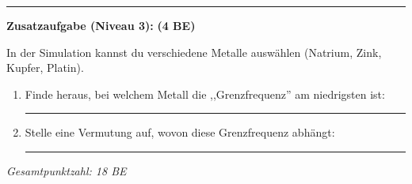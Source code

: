 \documentclass[11pt,a4paper]{article}
\begin{document}
\vspace{1em}


\hrule
\vspace{0.5em}

\textbf{Zusatzaufgabe (Niveau 3):} \hfill \textbf{(4 BE)}

In der Simulation kannst du verschiedene Metalle auswählen (Natrium, Zink, Kupfer, Platin).

\begin{enumerate}[label=\alph*)]
\item Finde heraus, bei welchem Metall die ,,Grenzfrequenz'' am niedrigsten ist: \rule{3cm}{0.4pt}

\item Stelle eine Vermutung auf, wovon diese Grenzfrequenz abhängt:

\rule{\textwidth}{0.4pt}
\end{enumerate}

\vspace{1em}

\begin{center}
\small\textit{Gesamtpunktzahl: 18 BE}
\end{center}
\end{document}
